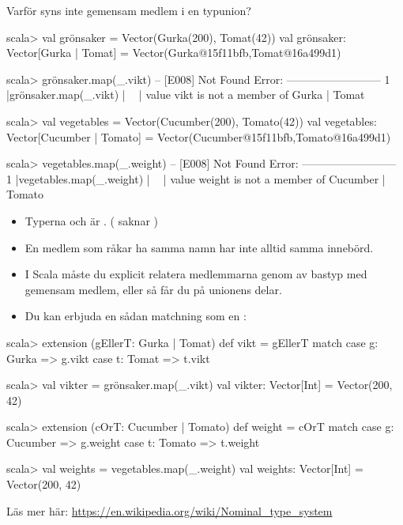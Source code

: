 \begin{Slide}{Varför syns inte gemensam medlem i en typunion?}
\ifswedish
\begin{REPLsmall}
scala> val grönsaker = Vector(Gurka(200), Tomat(42))
val grönsaker: Vector[Gurka | Tomat] = Vector(Gurka@15f11bfb,Tomat@16a499d1)

scala> grönsaker.map(_.vikt)
-- [E008] Not Found Error: --------------------------
1 |grönsaker.map(_.vikt)
  |              ^^^^^^
  |              value vikt is not a member of Gurka | Tomat
\end{REPLsmall}
\else
\begin{REPLsmall}
scala> val vegetables = Vector(Cucumber(200), Tomato(42))
val vegetables: Vector[Cucumber | Tomato] = Vector(Cucumber@15f11bfb,Tomato@16a499d1)

scala> vegetables.map(_.weight)
-- [E008] Not Found Error: --------------------------
1 |vegetables.map(_.weight)
  |              ^^^^^^
  |              value weight is not a member of Cucumber | Tomato
\end{REPLsmall}
\fi{}
\begin{itemize}\SlideFontTiny
  \item Typerna \ifswedish{}\else{}\fi{} och \ifswedish{}\else{}\fi{} är . ( saknar \ifswedish{}\else{}\fi{})
  \item En medlem som råkar ha samma namn har inte alltid samma innebörd.
  \item I Scala måste du explicit relatera medlemmarna genom  av bastyp med gemensam medlem, eller så får du  på unionens delar. 
  \pause\item Du kan erbjuda en sådan matchning som en :
\end{itemize}
\ifswedish
\begin{REPLsmall}
scala> extension (gEllerT: Gurka | Tomat) def vikt = gEllerT match
         case g: Gurka => g.vikt
         case t: Tomat => t.vikt

scala> val vikter = grönsaker.map(_.vikt)
val vikter: Vector[Int] = Vector(200, 42)
\end{REPLsmall}
\else
\begin{REPLsmall}
scala> extension (cOrT: Cucumber | Tomato) def weight = cOrT match
         case g: Cucumber => g.weight
         case t: Tomato => t.weight

scala> val weights = vegetables.map(_.weight)
val weights: Vector[Int] = Vector(200, 42)
\end{REPLsmall}
\fi{}
  \vspace*{-0.5em}\SlideFontTiny
  
  Läs mer här: \url{https://en.wikipedia.org/wiki/Nominal_type_system}
\end{Slide}


